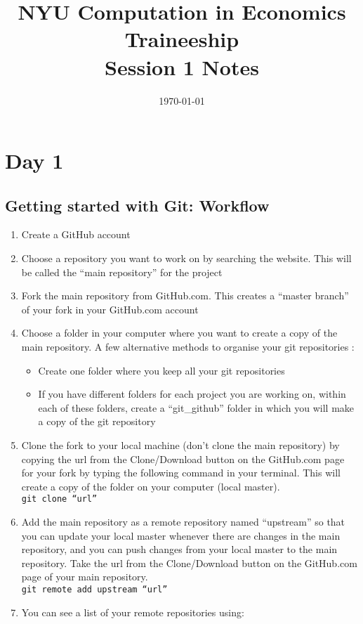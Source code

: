 \documentclass{article}
\title{NYU Computation in Economics Traineeship \\ Session 1 Notes \vspace{-3ex}}
\date{\today \vspace{-3ex}}
\begin{document}
\maketitle
\section{Day 1}
\subsection{Getting started with Git: Workflow}
\begin{enumerate}
	\item Create a GitHub account
	\item Choose a repository you want to work on by searching the website. This will be called the ``main repository'' for the project
	\item Fork the main repository from GitHub.com. This creates a ``master branch'' of your fork in your GitHub.com account
	\item Choose a folder in your computer where you want to create a copy of the main repository. A few alternative methods to organise your git repositories :
	\begin{itemize}
		\item Create one folder where you keep all your git repositories
		\item If you have different folders for each project you are working on, within each of these folders, create a ``git\_github'' folder in which you will make a copy of the git repository
	\end{itemize}
	\item Clone the fork to your local machine (don’t clone the main repository) by copying the url from the Clone/Download button on the GitHub.com page for your fork by typing the following command in your terminal. This will create a copy of the folder on your computer (local master). \\
	\texttt{git clone ``url''}
	\item Add the main repository as a remote repository named “upstream” so that you can update your local master whenever there are changes in the main repository, and you can push changes from your local master to the main repository. Take the url from the Clone/Download button on the GitHub.com page of your main repository. \\
	\texttt{git remote add upstream ``url''}
	\item You can see a list of your remote repositories using: \\

\end{enumerate}
\end{document}

